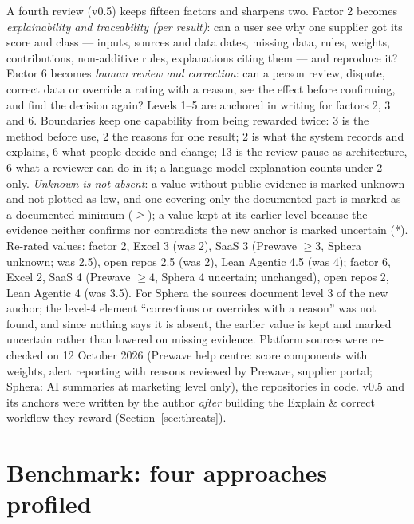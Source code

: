 \documentclass[10pt,twocolumn,a4paper]{article}
\begin{document}
A fourth review (v0.5) keeps fifteen factors and sharpens two. Factor 2 becomes
\emph{explainability and traceability (per result)}: can a user see why one supplier got its
score and class --- inputs, sources and data dates, missing data, rules, weights,
contributions, non-additive rules, explanations citing them --- and reproduce it? Factor 6
becomes \emph{human review and correction}: can a person review, dispute, correct data or
override a rating with a reason, see the effect before confirming, and find the decision
again? Levels 1--5 are anchored in writing for factors 2, 3 and 6. Boundaries keep one
capability from being rewarded twice: 3 is the method before use, 2 the reasons for one result;
2 is what the system records and explains, 6 what people decide and change; 13 is the review
pause as architecture, 6 what a reviewer can do in it; a language-model explanation counts under
2 only. \emph{Unknown is not absent}: a value without public evidence is marked unknown and not
plotted as low, and one covering only the documented part is marked as a documented minimum
($\geq$); a value kept at its earlier level because the evidence neither confirms nor
contradicts the new anchor is marked uncertain (*). Re-rated values: factor 2, Excel 3 (was 2), SaaS 3 (Prewave $\geq3$, Sphera unknown;
was 2.5), open repos 2.5 (was 2), Lean Agentic 4.5 (was 4); factor 6, Excel 2, SaaS 4 (Prewave
$\geq4$, Sphera 4 uncertain; unchanged), open repos 2, Lean Agentic 4 (was 3.5). For Sphera the
sources document level 3 of the new anchor; the level-4 element ``corrections or overrides with a
reason'' was not found, and since nothing says it is absent, the earlier value is kept and marked
uncertain rather than lowered on missing evidence. Platform sources were
re-checked on 12 October 2026 (Prewave help centre: score components with weights, alert
reporting with reasons reviewed by Prewave, supplier portal; Sphera: AI summaries at marketing
level only), the repositories in code. v0.5 and its anchors were written by the author
\emph{after} building the Explain \& correct workflow they reward
(Section~\ref{sec:threats}).

\section{Benchmark: four approaches profiled}
\label{sec:benchmark}
\end{document}
